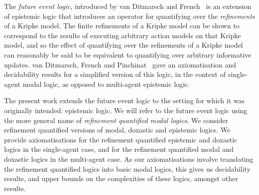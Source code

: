 The {\em future event logic}, introduced by van Ditmarsch and
French~\cite{french2009simulation} is an extension of epistemic logic that
introduces an operator for quantifying over the {\em refinements} of a Kripke
model. The finite refinements of a Kripke model can be shown to correspond to
the results of executing arbitrary action models on that Kripke model, and so
the effect of quantifying over the refinements of a Kripke model can reasonably
be said to be equivalent to quantifying over arbitrary informative updates. van
Ditmarsch, French and Pinchinat~\cite{french2010future} gave an axiomatisation
and decidability results for a simplified version of this logic, in the context
of single-agent modal logic, as opposed to multi-agent epistemic logic.

The present work extends the future event logic to the setting for which it was
originally intended: epistemic logic. We will refer to the future event logic
using the more general name of {\em refinement quantified modal logics}. We
consider refinement quantified versions of modal, doxastic and epistemic logics.
We provide axiomatisations for the refinement quantified epistemic and doxastic
logics in the single-agent case, and for the refinement quantified modal and
doxastic logics in the multi-agent case. As our axiomatisations involve
translating the refinement quantified logics into basic modal logics, this gives
us decidability results, and upper bounds on the complexities of these logics,
amongst other results.
